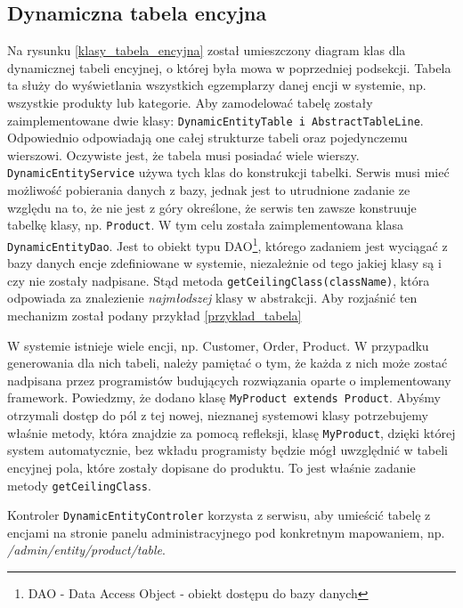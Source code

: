 \subsection{Dynamiczna tabela encyjna}
Na rysunku \ref{klasy_tabela_encyjna} został umieszczony diagram klas dla dynamicznej tabeli encyjnej, o której była mowa w poprzedniej podsekcji. Tabela ta służy do wyświetlania wszystkich egzemplarzy danej encji w systemie, np. wszystkie produkty lub kategorie. Aby zamodelować tabelę zostały zaimplementowane dwie klasy: \texttt{DynamicEntityTable i AbstractTableLine}. Odpowiednio odpowiadają one całej strukturze tabeli oraz pojedynczemu wierszowi. Oczywiste jest, że tabela musi posiadać wiele wierszy. \texttt{DynamicEntityService} używa tych klas do konstrukcji tabelki. Serwis musi mieć możliwość pobierania danych z bazy, jednak jest to utrudnione zadanie ze względu na to, że nie jest z góry określone, że serwis ten zawsze konstruuje tabelkę klasy, np. \texttt{Product}. W tym celu została zaimplementowana klasa \texttt{DynamicEntityDao}. Jest to obiekt typu DAO\footnote{DAO - Data Access Object - obiekt dostępu do bazy danych}, którego zadaniem jest wyciągać z bazy danych encje zdefiniowane w systemie, niezależnie od tego jakiej klasy są i czy nie zostały nadpisane. Stąd metoda \texttt{getCeilingClass(className)}, która odpowiada za znalezienie \textit{najmłodszej} klasy w abstrakcji. Aby rozjaśnić ten mechanizm został podany przykład \ref{przyklad_tabela}
\begin{example}
\label{przyklad_tabela}
	W systemie istnieje wiele encji, np. Customer, Order, Product. W przypadku generowania dla nich tabeli, należy pamiętać o tym, że każda z nich może zostać nadpisana przez programistów budujących rozwiązania oparte o implementowany framework. Powiedzmy, że dodano klasę \texttt{MyProduct extends Product}. Abyśmy otrzymali dostęp do pól z tej nowej, nieznanej systemowi klasy potrzebujemy właśnie metody, która znajdzie za pomocą refleksji, klasę \texttt{MyProduct}, dzięki której system automatycznie, bez wkładu programisty będzie mógł uwzględnić w tabeli encyjnej pola, które zostały dopisane do produktu. To jest właśnie zadanie metody \texttt{getCeilingClass}. 
\end{example}
Kontroler \texttt{DynamicEntityControler} korzysta z serwisu, aby umieścić tabelę z encjami na stronie panelu administracyjnego pod konkretnym mapowaniem, np. \textit{/admin/entity/product/table}. 
